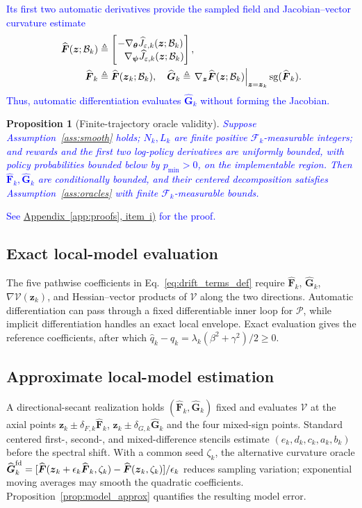\documentclass[journal]{IEEEtran}
\newtheorem{proposition}{Proposition}
\theoremstyle{remark}
\newcommand{\bz}{\boldsymbol{z}}
\newcommand{\btheta}{\boldsymbol{\theta}}
\newcommand{\bpsi}{\boldsymbol{\psi}}
\newcommand{\bF}{\boldsymbol{F}}
\newcommand{\hatF}{\widehat{\boldsymbol{F}}}
\newcommand{\hatG}{\widehat{\boldsymbol{G}}}
\newcommand{\Vk}{\mathcal{V}}
\newcommand{\cP}{\mathcal{P}}
\begin{document}
	\textcolor{blue}{Its first two automatic derivatives provide the sampled field and Jacobian--vector curvature estimate}
	\[
	\textcolor{blue}{
	\begin{aligned}
	\widehat{\bF}(\bz;\mathcal B_k)
	&\triangleq
	\begin{bmatrix}
	-\nabla_{\btheta}\widehat J_{\varepsilon,k}(\bz;\mathcal B_k)\\
	\phantom{-}\nabla_{\bpsi}\widehat J_{\varepsilon,k}(\bz;\mathcal B_k)
	\end{bmatrix},\\
	\hatF_k
	&\triangleq\widehat{\bF}(\bz_k;\mathcal B_k),\quad
	\hatG_k
	\triangleq
	\left.\nabla_{\bz}\widehat{\bF}(\bz;\mathcal B_k)\right|_{\bz=\bz_k}
	\operatorname{sg}(\hatF_k).
	\end{aligned}}
	\]
	\textcolor{blue}{Thus, automatic differentiation evaluates $\hatG_k$ without forming the Jacobian.}
	\begin{proposition}[Finite-trajectory oracle validity]\label{prop:trajectory_oracle_validity}
		\textcolor{blue}{Suppose Assumption~\ref{ass:smooth} holds; $N_k,L_k$ are finite positive $\mathscr F_k$-measurable integers; and rewards and the first two log-policy derivatives are uniformly bounded, with policy probabilities bounded below by $p_{\min}>0$, on the implementable region. Then $\hatF_k,\hatG_k$ are conditionally bounded, and their centered decomposition satisfies Assumption~\ref{ass:oracles} with finite $\mathscr F_k$-measurable bounds.}
	\end{proposition}
\textcolor{blue}{See \hyperref[app:trajectory_oracle_validity]{Appendix~\ref*{app:proofs}, item~i)} for the proof.}
	
	\subsection{Exact local-model evaluation}
	The five pathwise coefficients in Eq.~\eqref{eq:drift_terms_def} require $\hatF_k$, $\hatG_k$, $\nabla\Vk(\bz_k)$, and Hessian--vector products of $\Vk$ along the two directions. Automatic differentiation can pass through a fixed differentiable inner loop for $\cP$, while implicit differentiation handles an exact local envelope. Exact evaluation gives the reference coefficients, after which $\hat q_k-q_k=\lambda_k(\beta^2+\gamma^2)/2\ge0$.
	
	\subsection{Approximate local-model estimation}
	A directional-secant realization holds $(\hatF_k,\hatG_k)$ fixed and evaluates $\Vk$ at the axial points $\bz_k\pm\delta_{F,k}\hatF_k$, $\bz_k\pm\delta_{G,k}\hatG_k$ and the four mixed-sign points. Standard centered first-, second-, and mixed-difference stencils estimate $(e_k,d_k,c_k,a_k,b_k)$ before the spectral shift. With a common seed $\zeta_k$, the alternative curvature oracle $\hatG_k^{\rm fd}=[\hatF(\bz_k+\epsilon_k\hatF_k,\zeta_k)-\hatF(\bz_k,\zeta_k)]/\epsilon_k$ reduces sampling variation; exponential moving averages may smooth the quadratic coefficients. Proposition~\ref{prop:model_approx} quantifies the resulting model error.
	
\end{document}
